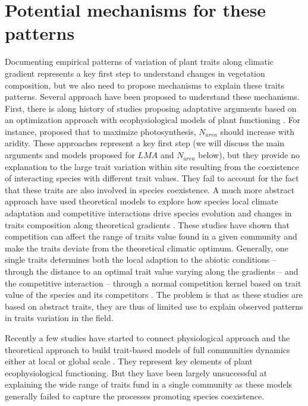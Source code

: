 \documentclass[a4paper,11pt]{article}
\begin{document}
\clearpage

\section{Potential mechanisms for these patterns}

Documenting empirical patterns of variation of plant traits along
climatic gradient represents a key first step to understand changes in
vegetation composition, but we also need to propose mechanisms to
explain these traits patterns. Several approach have been proposed to
understand these mechanisms. First, there is along history of studies
proposing adaptative arguments based on an optimization approach with
ecophysiological models of plant functioning \citep{Makela-2002}. For
instance, \citet{Wright-2003} proposed that to maximize
photosynthesis, $N_{area}$ should increase with aridity. These
approaches represent a key first step (we will discuss the main
arguments and models proposed for $LMA$ and $N_{area}$ below), but
they provide no explanation to the large trait variation within site
resulting from the coexistence of interacting species with different
trait values. They fail to account for the fact that these traits are
also involved in species coexistence. A much more abstract approach
have used theoretical models to explore how species local climate
adaptation and competitive interactions drive species evolution and
changes in traits composition along theoretical gradients
\citep{Case-2000,Doebeli-2003,Goldberg-2006,Leimar-2008}. These
studies have shown that competition can affect the range of traits
value found in a given community and make the traits deviate from the
theoretical climatic optimum.  Generally, one single traits determines
both the local adaption to the abiotic conditions -- through the
distance to an optimal trait value varying along the gradients -- and
the competitive interaction -- through a normal competition kernel
based on trait value of the species and its competitors \citep[see][]{Case-2000}. The problem is that as these studies are based on abstract traits, they are thus of limited use to explain observed patterns in traits variation in the field.

Recently a few studies have started to connect physiological approach
and the theoretical approach to build trait-based models of full
communities dynamics either at local \citep{Farrior-2013} or global
scale \citep[see][]{Sakschewski-2015,Scheiter-2013}. They represent key elements of plant ecophysiological functioning. But they have been largely unsuccessful at explaining the wide range of traits fund in a single community as these models generally failed to capture the processes promoting species coexistence.
\end{document}
